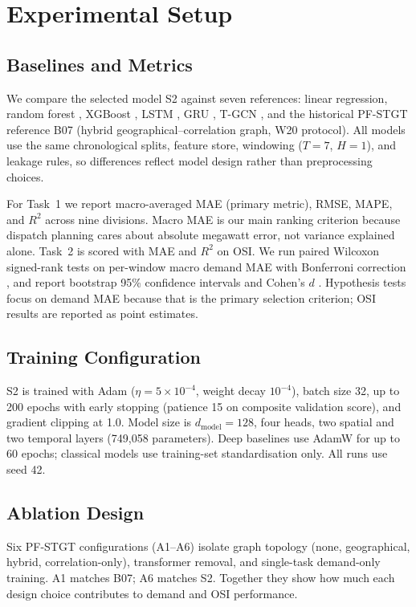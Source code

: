\section{Experimental Setup}\label{sec:experimental_setup}

\subsection{Baselines and Metrics}

We compare the selected model S2 against seven references: linear regression, random forest \cite{Breiman2001RandomForest}, XGBoost \cite{Chen2016XGBoost}, LSTM \cite{Hochreiter1997LSTM}, GRU \cite{Cho2014GRU}, T-GCN \cite{Zhao2020TGCN}, and the historical PF-STGT reference B07 (hybrid geographical--correlation graph, W20 protocol). All models use the same chronological splits, feature store, windowing ($T{=}7$, $H{=}1$), and leakage rules, so differences reflect model design rather than preprocessing choices.

For Task~1 we report macro-averaged MAE (primary metric), RMSE, MAPE, and $R^2$ across nine divisions. Macro MAE is our main ranking criterion because dispatch planning cares about absolute megawatt error, not variance explained alone. Task~2 is scored with MAE and $R^2$ on OSI. We run paired Wilcoxon signed-rank tests \cite{Wilcoxon1945SignedRank} on per-window macro demand MAE with Bonferroni correction \cite{Dunn1961Bonferroni}, and report bootstrap 95\% confidence intervals \cite{Efron1993Bootstrap} and Cohen's $d$ \cite{Cohen1988StatisticalPower}. Hypothesis tests focus on demand MAE because that is the primary selection criterion; OSI results are reported as point estimates.

\subsection{Training Configuration}

S2 is trained with Adam \cite{Kingma2015Adam} ($\eta{=}5{\times}10^{-4}$, weight decay $10^{-4}$), batch size 32, up to 200 epochs with early stopping (patience 15 on composite validation score), and gradient clipping at 1.0. Model size is $d_{\mathrm{model}}{=}128$, four heads, two spatial and two temporal layers (749,058 parameters). Deep baselines use AdamW for up to 60 epochs; classical models use training-set standardisation only. All runs use seed 42.

\subsection{Ablation Design}

Six PF-STGT configurations (A1--A6) isolate graph topology (none, geographical, hybrid, correlation-only), transformer removal, and single-task demand-only training. A1 matches B07; A6 matches S2. Together they show how much each design choice contributes to demand and OSI performance.
